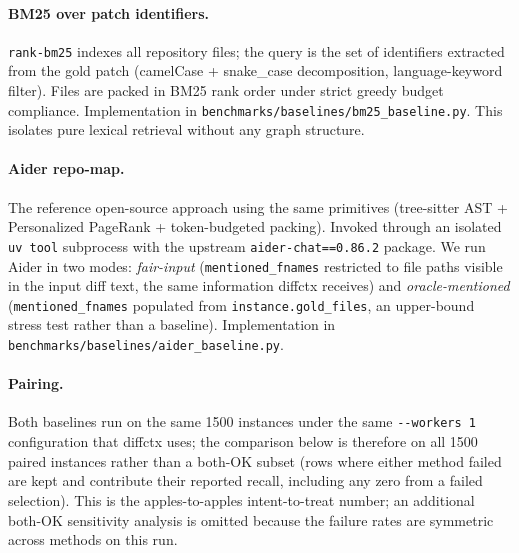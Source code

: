 \documentclass[11pt, a4paper]{article}
\begin{document}
\paragraph{BM25 over patch identifiers.} \texttt{rank-bm25} indexes all repository files; the query is the set of identifiers extracted from the gold patch (camelCase + snake\_case decomposition, language-keyword filter). Files are packed in BM25 rank order under strict greedy budget compliance. Implementation in \texttt{benchmarks/baselines/bm25\_baseline.py}. This isolates pure lexical retrieval without any graph structure.

\paragraph{Aider repo-map.} The reference open-source approach using the same primitives (tree-sitter AST + Personalized PageRank + token-budgeted packing). Invoked through an isolated \texttt{uv tool} subprocess with the upstream \texttt{aider-chat==0.86.2} package. We run Aider in two modes: \emph{fair-input} (\texttt{mentioned\_fnames} restricted to file paths visible in the input diff text, the same information diffctx receives) and \emph{oracle-mentioned} (\texttt{mentioned\_fnames} populated from \texttt{instance.gold\_files}, an upper-bound stress test rather than a baseline). Implementation in \texttt{benchmarks/baselines/aider\_baseline.py}.

\paragraph{Pairing.} Both baselines run on the same 1500 instances under the same \texttt{-{}-workers 1} configuration that diffctx uses; the comparison below is therefore on all 1500 paired instances rather than a both-OK subset (rows where either method failed are kept and contribute their reported recall, including any zero from a failed selection). This is the apples-to-apples intent-to-treat number; an additional both-OK sensitivity analysis is omitted because the failure rates are symmetric across methods on this run.
\end{document}

